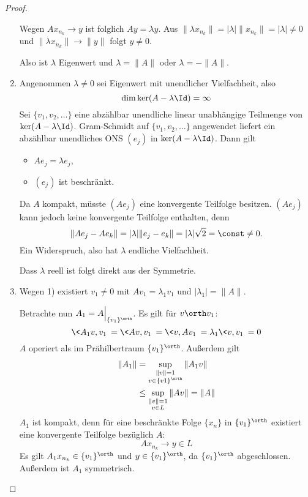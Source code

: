 \begin{st}
\begin{proof}
\begin{enumerate}[1)]
				Wegen $Ax_{n_k} \to y$ ist folglich $Ay = \lambda y$.
				Aus $\|\lambda x_{n_k}\| = |\lambda | \|x_{n_k}\| = |\lambda| \neq 0$ und $\|\lambda x_{n_k}\| \to \|y\|
				$ folgt $y\neq 0$.

				Also ist $\lambda$ Eigenwert und $\lambda = \|A\|$ oder $\lambda = - \|A\|$. 
			\item

				Angenommen $\lambda \neq 0$ sei Eigenwert mit unendlicher Vielfachheit, also
				\[
					\dim \ker (A - \lambda \Id) = \infty
				\]
				Sei $\{v_1,v_2,\dotsc\}$ eine abzählbar unendliche linear unabhängige Teilmenge von $\ker(A-\lambda \Id)$.
				Gram-Schmidt auf $\{v_1,v_2,\dotsc\}$ angewendet liefert ein abzählbar unendliches ONS $(e_j)$ in $\ker (A-\lambda \Id)$.
				Dann gilt
				\begin{itemize}
					\item
						$Ae_j = \lambda e_j$,
					\item
						$(e_j)$ ist beschränkt.
				\end{itemize}
				Da $A$ kompakt, müsste $(Ae_j)$ eine konvergente Teilfolge besitzen.
				$(Ae_j)$ kann jedoch keine konvergente Teilfolge enthalten, denn
				\[
					\|Ae_j - Ae_k\| = |\lambda| \|e_j-e_k\| = |\lambda| \sqrt 2 = \const \neq 0.
				\]
				Ein Widerspruch, also hat $\lambda$ endliche Vielfachheit.

				Dass $\lambda$ reell ist folgt direkt aus der Symmetrie.
			\item
				Wegen 1) existiert $v_1 \neq 0$ mit $Av_1 = \lambda_1v_1$ und $|\lambda_1| = \|A\|$.

				Betrachte nun $A_1 = A \Big|_{\{v_1\}^\orth}$.
				Es gilt für $v \orth v_1$:
				\[
					\<A_1v,v_1\> = \<Av,v_1\> = \<v,Av_1\> = \lambda_1\<v,v_1\> = 0
				\]
				$A$ operiert als im Prähilbertraum $\{v_1\}^\orth$.
				Außerdem gilt
				\begin{align*}
					\|A_1\| 
					&= \sup_{\substack{\|v\|=1 \\ v\in \{v1\}^\orth}} \|A_1 v\| \\
					&\le \sup_{\substack{\|v\|=1 \\ v\in L}} \|A v\| 
					= \|A\|
				\end{align*}
				$A_1$ ist kompakt, denn für eine beschränkte Folge $\{x_n\}$ in $\{v_1\}^\orth$ existiert eine konvergente Teilfolge bezüglich $A$:
				\[
					A x_{n_k} \to y \in L
				\]
				Es gilt $A_1 x_{n_k} \in \{v_1\}^\orth$ und $y \in \{v_1\}^\orth$, da $\{v_1\}^\orth$ abgeschlossen.
				Außerdem ist $A_1$ symmetrisch.


\end{enumerate}
\end{proof}
\end{st}

